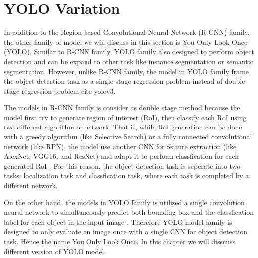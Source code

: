 \chapter{YOLO Variation} \label{chap:yolo_variation}

In addition to the Region-based Convolutional Neural Network (R-CNN) family, the other family of model we will discuss in this section is You Only Look Once (YOLO). Similar to R-CNN family, YOLO family also designed to perform object detection and can be expand to other task like instance segmentation or semantic segmentation. However, unlike R-CNN family, the model in YOLO family frame the object detection task as a single stage regression problem instead of double stage regression problem {\color{red} cite yolov3}. 

The models in R-CNN family is consider as double stage method because the model first try to generate region of interest (RoI), then classify each RoI using two different algorithm or network. That is, while RoI generation can be done with a greedy algorithm (like Selective Search) or a fully connected convolutional network (like RPN), the model use another CNN for feature extraction (like AlexNet, VGG16, and ResNet) and adapt it to perform classfication for each generated RoI \cite{Girshick_R_CNN_2013, fast_rcnn_og, faster_rcnn_2015}. For this reason, the object detection task is seperate into two tasks: localization task and classfication task, where each task is completed by a different network.

On the other hand, the models in YOLO family is utilized a single convolution neural network to simultaneously predict both bounding box and the classfication label for each object in the input image \cite{yolov1_2016}. Therefore YOLO model family is designed to only evaluate an image once with a single CNN for object detection task. Hence the name You Only Look Once. In this chapter we will disscuss different version of YOLO model.







